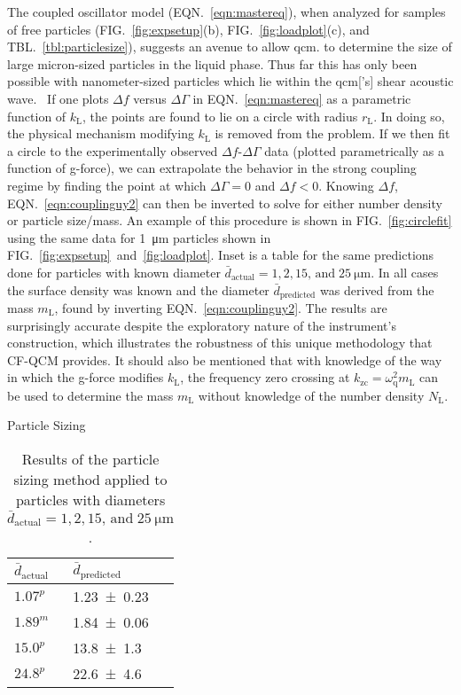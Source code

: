 \documentclass[floatfix,superscriptaddress,a4paper,twocolumn]{revtex4-1}
\newcommand{\Figure}[1]{FIG.~\ref{#1}}
\newcommand{\Figures}[2]{FIG.~\ref{#1}~and~\ref{#2}}
\newcommand{\Equation}[1]{EQN.~\ref{#1}}
\newcommand{\Table}[1]{TBL.~\ref{#1}}
\newcommand{\df}{\Delta\!f}
\newcommand{\dg}{\Delta\Gamma}
\newcommand{\kl}{k_\mathrm{L}}
\newcommand{\ml}{m_\mathrm{L}}
\newcommand{\omegaq}{\omega_\mathrm{q}}
\begin{document}
The coupled oscillator model (\Equation{eqn:mastereq}), when analyzed for
samples of free particles (\Figure{fig:expsetup}(b),
\Figure{fig:loadplot}(c), and \Table{tbl:particlesize}), suggests an avenue
to allow \gls{qcm}. to determine the size of large micron-sized particles in the
liquid phase.  Thus far this has only been possible with nanometer-sized
particles which lie within the \gls{qcm}['s] shear acoustic
wave.~\cite{olsson2013using}  If one plots $\df$ versus $\dg$ in
\Equation{eqn:mastereq} as a parametric function of $\kl$, the points are
found to lie on a circle with radius $r_\mathrm{L}$.  In doing so, the physical
mechanism modifying $\kl$ is removed from the problem.
If we then fit a
circle to the experimentally observed $\df$-$\dg$ data (plotted
parametrically as a function of g-force), we can extrapolate the behavior
in the strong coupling regime by finding the point at which $\dg=0$ and
$\df<0$.  Knowing $\df$, \Equation{eqn:couplinguy2} can then be inverted to
solve for either number density or particle size/mass.  An example of this
procedure is shown in \Figure{fig:circlefit} using the same data for
\SI{1}{\micro\meter} particles shown in
\Figures{fig:expsetup}{fig:loadplot}.  Inset is a table for the same
predictions done for particles with known diameter
$\bar{d}_\mathrm{actual}=1, 2, 15,\,\mathrm{and}\;\SI{25}{\micro\meter}$.
In all cases the surface density was known and the diameter
$\bar{d}_\text{predicted}$ was derived from the mass $\ml$, found by
inverting \Equation{eqn:couplinguy2}.  The results are surprisingly accurate
despite the exploratory nature of the instrument's construction, which
illustrates the robustness of this unique methodology that CF-QCM
provides.
It should also be mentioned that with knowledge of the way in which the
g-force modifies $\kl$, the frequency zero crossing at
$k_\mathrm{zc}=\omegaq^2\ml$ can be used to determine the mass $\ml$
without knowledge of the number density $N_\mathrm{L}$.
\begin{table}[ht]
  \centering
  Particle Sizing\\
  \begin{tabularx}{80pt}{XX}
    \toprule
    $\bar{d}_\mathrm{actual}$ & $\bar{d}_\mathrm{predicted}$ \\
    \midrule
    $1.07^p$                  & \num{1.23+-0.23}             \\
    $1.89^m$                  & \num{1.84+-0.06}             \\
    $15.0^p$                  & \num{13.8+-1.3}              \\
    $24.8^p$                  & \num{22.6+-4.6}              \\
    \bottomrule
  \end{tabularx}
  \caption{Results of the particle sizing method applied to particles with diameters
    $\bar{d}_\mathrm{actual}=1, 2, 15,\,\mathrm{and}\;\SI{25}{\micro\meter}$.}
  \label{tbl:particlesizing}
\end{table}
\end{document}
